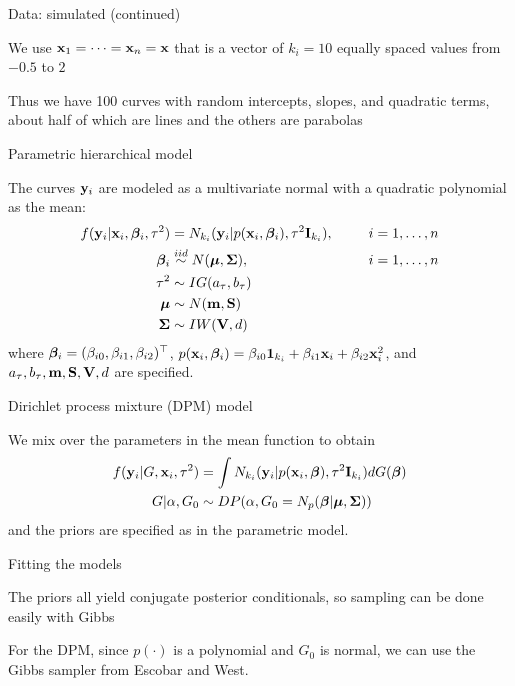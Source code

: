 \documentclass[mathserif, 12pt, t]{beamer}
\begin{document}
\begin{frame}{Data: simulated (continued)}

We use $\mathbf{\bm{x}}_1=\cdots=\mathbf{\bm{x}}_n=\mathbf{\bm{x}}$ that is a vector of $k_i=10$ equally spaced values from $-0.5$ to $2$
\bigskip

Thus we have 100 curves with random intercepts, slopes, and quadratic terms, about half of which are lines and the others are parabolas
\end{frame}

\begin{frame}{Parametric hierarchical model}

The curves $\mathbf{\bm{y}}_i$ are modeled as a multivariate normal with a quadratic polynomial as the mean:
\begin{align*}
f(\mathbf{\bm{y}}_i|\mathbf{\bm{x}}_i,\mathbf{\bm{\beta}}_i,\tau^2) &= N_{k_i}(\mathbf{\bm{y}}_i|p(\mathbf{\bm{x}}_i, \mathbf{\bm{\beta}}_i), \tau^2\mathbf{\bm{I}}_{k_i}),~~~~~&i=1,\ldots,n \\
\mathbf{\bm{\beta}}_i &\overset{iid}\sim N(\mathbf{\bm{\mu}}, \mathbf{\bm{\Sigma}}),~~~~~&i=1,\ldots,n \\
\tau^2 &\sim IG(a_\tau, b_\tau) \\
\mathbf{\bm{\mu}} &\sim N(\mathbf{\bm{m}}, \mathbf{\bm{S}}) \\
\mathbf{\bm{\Sigma}} &\sim IW(\mathbf{\bm{V}}, d) 
\end{align*}
where $\mathbf{\bm{\beta}}_i=(\beta_{i0}, \beta_{i1}, \beta_{i2})^\top$, $p(\mathbf{\bm{x}}_i,\mathbf{\bm{\beta}}_i) = \beta_{i0}\mathbf{\bm{1}}_{k_i} + \beta_{i1}\mathbf{\bm{x}}_i + \beta_{i2}\mathbf{\bm{x}}_i^2$, and $a_\tau, b_\tau, \mathbf{\bm{m}}, \mathbf{\bm{S}}, \mathbf{\bm{V}}, d$ are specified.

\end{frame}



\begin{frame}{Dirichlet process mixture (DPM) model}

We mix over the parameters in the mean function to obtain
\begin{align*}
f(\mathbf{\bm{y}}_i|G,\mathbf{\bm{x}}_i, \tau^2) &= \int N_{k_i}(\mathbf{\bm{y}}_i|p(\mathbf{\bm{x}}_i, \mathbf{\bm{\beta}}), \tau^2\mathbf{\bm{I}}_{k_i})dG(\mathbf{\bm{\beta}}) \\
G|\alpha, G_0 &\sim DP(\alpha, G_0=N_p(\mathbf{\bm{\beta}}|\mathbf{\bm{\mu}}, \mathbf{\bm{\Sigma}}))
\end{align*}
and the priors are specified as in the parametric model. %

\end{frame}

\begin{frame}{Fitting the models}

The priors all yield conjugate posterior conditionals, so sampling can be done easily with Gibbs
\bigskip

For the DPM, since $p(\cdot)$ is a polynomial and $G_0$ is normal, we can use the Gibbs sampler from Escobar and West.

\end{frame}
\end{document}
